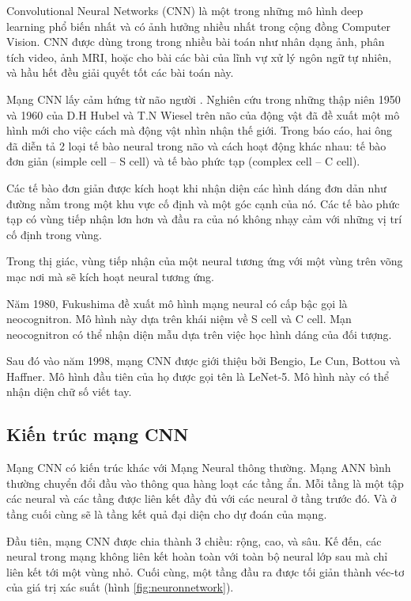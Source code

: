 Convolutional Neural Networks (CNN) là một trong những mô hình deep learning phổ biến nhất và có ảnh hưởng nhiều nhất trong cộng đồng Computer Vision. CNN được dùng trong trong nhiều bài toán như nhân dạng ảnh, phân tích video, ảnh MRI, hoặc cho bài các bài của lĩnh vự xử lý ngôn ngữ tự nhiên, và hầu hết đều giải quyết tốt các bài toán này.

Mạng CNN lấy cảm hứng từ não người \cite{cnnhumanbrain}. Nghiên cứu trong những thập niên 1950 và 1960 của D.H Hubel và T.N Wiesel trên não của động vật đã đề xuất một mô hình mới cho việc cách mà động vật nhìn nhận thế giới. Trong báo cáo, hai ông đã diễn tả 2 loại tế bào neural trong não và cách hoạt động khác nhau: tế bào đơn giản (simple cell – S cell) và tế bào phức tạp (complex cell – C cell). 

Các tế bào đơn giản được kích hoạt khi nhận diện các hình dáng đơn dản như đường nằm trong một khu vực cố định và một góc cạnh của nó. Các tế bào phức tạp có vùng tiếp nhận lơn hơn và đầu ra của nó không nhạy cảm với những vị trí cố định trong vùng. 

Trong thị giác, vùng tiếp nhận của một neural tương ứng với một vùng trên võng mạc nơi mà sẽ kích hoạt neural tương ứng. 

Năm 1980, Fukushima đề xuất mô hình mạng neural có cấp bậc gọi là neocognitron. Mô hình này dựa trên khái niệm về S cell và C cell. Mạn neocognitron có thể nhận diện mẫu dựa trên việc học hình dáng của đối tượng. 

Sau đó vào năm 1998, mạng CNN được giới thiệu bởi Bengio, Le Cun, Bottou và Haffner. Mô hình đầu tiên của họ được gọi tên là LeNet-5. Mô hình này có thể nhận diện chữ số viết tay.

\subsection{Kiến trúc mạng CNN}
Mạng CNN có kiến trúc khác với Mạng Neural thông thường. Mạng ANN bình thường chuyển đổi đầu vào thông qua hàng loạt các tầng ẩn. Mỗi tầng là một tập các neural và các tầng được liên kết đầy đủ với các neural ở tầng trước đó. Và ở tầng cuối cùng sẽ là tầng kết quả đại diện cho dự đoán của mạng.

Đầu tiên, mạng CNN được chia thành 3 chiều: rộng, cao, và sâu. Kế đến, các neural trong mạng không liên kết hoàn toàn với toàn bộ neural lớp sau mà chỉ liên kết tới một vùng nhỏ. Cuối cùng, một tầng đầu ra được tối giản thành véc-tơ của giá trị xác suất (hình \ref{fig:neuronnetwork}).

